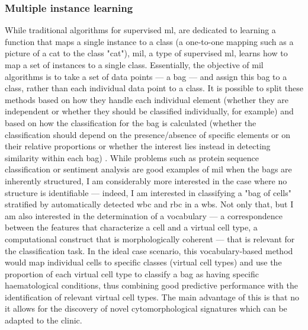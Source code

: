 \begin{figure}[!ht]
    \label{fig:u-map-condition-density}
\end{figure}

\subsubsection{Multiple instance learning}

While traditional algorithms for supervised \ac{ml}, are dedicated to learning a function that maps a single instance to a class (a one-to-one mapping such as a picture of a cat to the class "cat"), \ac{mil}, a type of supervised \ac{ml}, learns how to map a set of instances to a single class. Essentially, the objective of \ac{mil} algorithms is to take a set of data points --- a bag --- and assign this bag to a class, rather than each individual data point to a class. It is possible to split these methods based on how they handle each individual element (whether they are independent or whether they should be classified individually, for example) and based on how the classification for the bag is calculated (whether the classification should depend on the presence/absence of specific elements or on their relative proportions or whether the interest lies instead in detecting similarity within each bag) \cite{Amores2013-ym,Carbonneau2016-xc}. While problems such as protein sequence classification or sentiment analysis are good examples of \ac{mil} when the bags are inherently structured, I am considerably more interested in the case where no structure is identifiable --- indeed, I am interested in classifying a "bag of cells" stratified by automatically detected \ac{wbc} and \ac{rbc} in a \ac{wbs}. Not only that, but I am also interested in the determination of a vocabulary --- a correspondence between the features that characterize a cell and a virtual cell type, a computational construct that is morphologically coherent --- that is relevant for the classification task. In the ideal case scenario, this vocabulary-based method would map individual cells to specific classes (virtual cell types) and use the proportion of each virtual cell type to classify a bag as having specific haematological conditions, thus combining good predictive performance with the identification of relevant virtual cell types. The main advantage of this is that no it allows for the discovery of novel cytomorphological signatures which can be adapted to the clinic.

